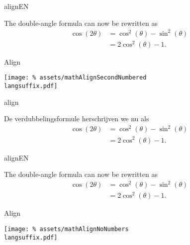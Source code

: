     \begin{saveblock}{alignEN}
        \begin{highlightblock}[gobble=12,linewidth=\textwidth,
            framexleftmargin=0.25em,xleftmargin=0.25em]
            The double-angle formula can now be rewritten as
            \begin{align}
                \cos(2\theta) &= \cos^2(\theta) - \sin^2(\theta)
                \nonumber\\
                &= 2\cos^2(\theta)-1.
            \end{align}
        \end{highlightblock}
    \end{saveblock}


    \begin{frame}{Align}

        \texttt{[image: \%
            assets/mathAlignSecondNumbered\\langsuffix.pdf]}
    \end{frame}
\fi


\begin{saveblock}{align}
    \begin{highlightblock}[gobble=8,linewidth=\textwidth,
        framexleftmargin=0.25em,xleftmargin=0.25em]
        De verdubbelingsformule herschrijven we nu als
        \begin{align*}
            \cos(2\theta) &= \cos^2(\theta) - \sin^2(\theta)\\
            &= 2\cos^2(\theta)-1.
        \end{align*}
    \end{highlightblock}
\end{saveblock}

\begin{saveblock}{alignEN}
    \begin{highlightblock}[gobble=8,linewidth=\textwidth,
        framexleftmargin=0.25em,xleftmargin=0.25em]
        The double-angle formula can now be rewritten as
        \begin{align*}
            \cos(2\theta) &= \cos^2(\theta) - \sin^2(\theta)\\
            &= 2\cos^2(\theta)-1.
        \end{align*}
    \end{highlightblock}
\end{saveblock}


\begin{frame}{Align}

    \texttt{[image: \%
        assets/mathAlignNoNumbers\\langsuffix.pdf]}
\end{frame}

